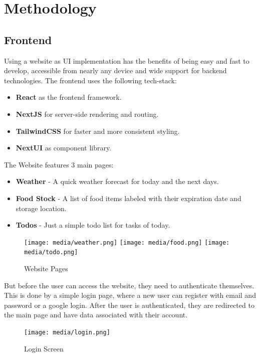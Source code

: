 
\section{Methodology}\label{sec:Methodology}
\subsection{Frontend}
Using a website as UI implementation has the benefits of being easy and fast to develop, accessible from nearly any device and wide support for backend technologies. The frontend uses the following tech-stack:
\begin{itemize}
    \item \textbf{React} as the frontend framework.
    \item \textbf{NextJS} for server-side rendering and routing.
    \item \textbf{TailwindCSS} for faster and more consistent styling.
    \item \textbf{NextUI} as component library.
\end{itemize}

The Website features 3 main pages:
\begin{itemize}
    \item \textbf{Weather} - A quick weather forecast for today and the next days.
    \item \textbf{Food Stock} - A list of food items labeled with their expiration date and storage location.
    \item \textbf{Todos} - Just a simple todo list for tasks of today.
\end{itemize}

\begin{figure}[H]
    \texttt{[image: media/weather.png]}
    \texttt{[image: media/food.png]}
    \texttt{[image: media/todo.png]}
    \caption{Website Pages}
    \label{fig:website}
\end{figure}

But before the user can access the website, they need to authenticate themselves. This is done by a simple login page, where a new user can register with email and password or a google login. After the user is authenticated, they are redirected to the main page and have data associated with their account.

\begin{figure}[H]
    \centering
    \texttt{[image: media/login.png]}
    \caption{Login Screen}
    \label{fig:login}
\end{figure}

